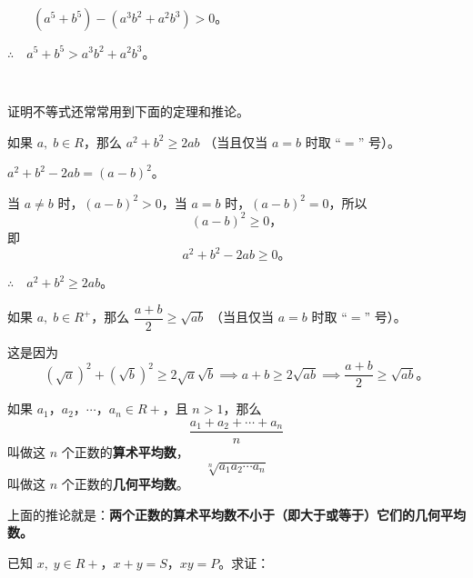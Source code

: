 $\qquad (a^5 + b^5) - (a^3b^2 + a^2b^3) > 0 \text{。} $

$\therefore \quad a^5 + b^5 > a^3b^2 + a^2b^3 \text{。} $


\lianxi
\begin{xiaotis}




\shangyihang
{}

\end{xiaotis}

\,

证明不等式还常常用到下面的定理和推论。

\setcounter{theorem}{0}
\begin{theorem} \label{theorem:bdszm-1}
    如果 $a,\; b \in R$，那么 $a^2 + b^2 \geqslant 2ab$ （当且仅当 $a = b$ 时取 “$=$” 号）。
\end{theorem}

\zhengming $a^2 + b^2 - 2ab = (a - b)^2$。

当 $a \neq b$ 时，$(a - b)^2 > 0$，当 $a = b$ 时，$(a - b)^2 = 0$，所以
$$ (a - b)^2 \geqslant 0 \text{，} $$
即
$$ a^2 + b^2 - 2ab \geqslant 0 \text{。} $$

$\therefore \quad a^2 + b^2 \geqslant 2ab$。

\setcounter{corollary}{0}
\begin{corollary} \label{corollary:bdszm-1-1}
    如果 $a,\; b \in R^+$，那么 $\dfrac{a + b}{2} \geqslant \sqrt{ab}$ （当且仅当 $a = b$ 时取 “$=$” 号）。
\end{corollary}

这是因为
$$ (\sqrt{a})^2 + (\sqrt{b})^2 \geqslant 2\sqrt{a}\sqrt{b} \implies a + b \geqslant 2\sqrt{ab} \implies \dfrac{a + b}{2} \geqslant \sqrt{ab} \text{。} $$

如果 $a_1$，$a_2$，$\cdots$，$a_n \in R+$，且 $n > 1$，那么
$$ \dfrac{a_1 + a_2 + \cdots + a_n}{n} $$
叫做这 $n$ 个正数的\textbf{算术平均数}，
$$ \sqrt[n]{a_1 a_2 \cdots a_n} $$
叫做这 $n$ 个正数的\textbf{几何平均数}。

上面的推论就是：\textbf{两个正数的算术平均数不小于（即大于或等于）它们的几何平均数。}

\liti 已知 $x,\; y \in R+$，$x + y = S$，$xy = P$。求证：


